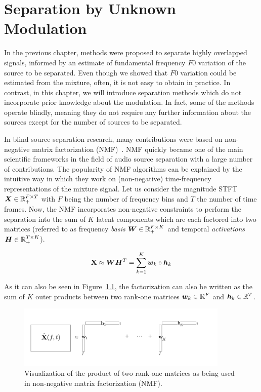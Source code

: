 \chapter{Separation by Unknown Modulation}
\label{cha:unknown}

In the previous chapter, methods were proposed to separate highly overlapped signals, informed by an estimate of fundamental frequency \(F0\) variation of the source to be separated.
Even though we showed that \(F0\)  variation could be estimated from the mixture, often, it is not easy to obtain in practice.
In contrast, in this chapter, we will introduce separation methods which do not incorporate prior knowledge about the modulation. 
In fact, some of the methods operate blindly, meaning they do not require any further information about the sources except for the number of sources to be separated.
\par
In blind source separation research, many contributions were based on non-negative matrix factorization (NMF)~\cite{lee99, lee01}.
NMF quickly became one of the main scientific frameworks in the field of audio source separation with a large number of contributions.
The popularity of NMF algorithms can be explained by the intuitive way in which they work on (non-negative) time-frequency representations of the mixture signal.
Let us consider the magnitude STFT \({\bm{X}} \in {\mathbb{R}}_{+}^{F \times T}\) with \(F\) being the number of frequency bins and \(T\) the number of time frames.
Now, the NMF incorporates non-negative constraints to perform the separation into the sum of \(K\) latent components which are each factored into two matrices (referred to as frequency \emph{basis} \({\bm{W}} \in {\mathbb{R}}_{+}^ { F \times K }\) and temporal \emph{activations} \({\bm{H}} \in {\mathbb{R}}_{+}^ { T \times K }\)). 

\begin{equation}
   \mathbf{X} \approx {\bm{W}} {\bm{H}}^{T} = \sum\limits_{k=1}^{K} {\bm{w}}_{k} \circ {\bm{h}}_{k}
   \label{eq:vanilla_nmf}
\end{equation}

As it can also be seen in Figure~\ref{fig:nmf}, the factorization can also be
written as the sum of \(K\) outer products between two rank-one matrices \({\bm{w}}_k \in {\mathbb{R}}^F\)
and \({\bm{h}}_k \in {\mathbb{R}}^T\).

\begin{figure}[ht]
  \centering
  \includegraphics[width=0.9\textwidth]{Chapters/06_Separation_Unknown/figures/nmf.pdf}
  \caption{Visualization of the product of two rank-one matrices as being used in non-negative matrix factorization (NMF).}
  \label{fig:nmf}
\end{figure}

